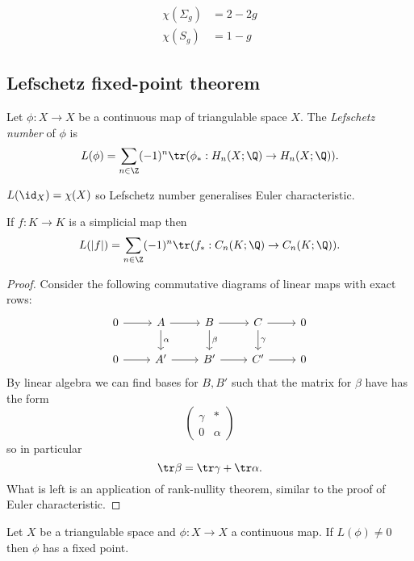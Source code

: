 \documentclass[a4paper]{article}
\begin{document}
\begin{note}
  \begin{align*}
    \chi(\Sigma_g) &= 2 - 2g \\
    \chi(S_g) &= 1 - g
  \end{align*}
\end{note}

\subsection{Lefschetz fixed-point theorem}

\begin{definition}
  Let \(\phi: X \to X\) be a continuous map of triangulable space \(X\). The \emph{Lefschetz number} of \(\phi\) is
  \[
    L(\phi) = \sum_{n \in \Z} (-1)^n \tr(\phi_*: H_n(X; \Q) \to H_n(X; \Q)).
  \]
\end{definition}

\begin{note}
  \(L(\id_X) = \chi(X)\) so Lefschetz number generalises Euler characteristic.
\end{note}

\begin{lemma}
  If \(f: K \to K\) is a simplicial map then
  \[
    L(|f|) = \sum_{n \in \Z} (-1)^n \tr(f_*: C_n(K; \Q) \to C_n(K; \Q)).
  \]
\end{lemma}

\begin{proof}
  Consider the following commutative diagrams of linear maps with exact rows:
  \[
    \begin{tikzcd}
      0 \ar[r] & A \ar[r] \ar[d, "\alpha"] & B \ar[r] \ar[d, "\beta"] & C \ar[r] \ar[d, "\gamma"] & 0 \\
      0 \ar[r] & A' \ar[r] & B' \ar[r] & C' \ar[r] & 0
    \end{tikzcd}
  \]
  By linear algebra we can find bases for \(B, B'\) such that the matrix for \(\beta\) have has the form
  \[
    \begin{pmatrix}
      \gamma & * \\
      0 & \alpha
    \end{pmatrix}
  \]
  so in particular
  \[
    \tr \beta = \tr \gamma + \tr \alpha.
  \]
  What is left is an application of rank-nullity theorem, similar to the proof of Euler characteristic.
\end{proof}

\begin{theorem}
  Let \(X\) be a triangulable space and \(\phi: X \to X\) a continuous map. If \(L(\phi) \neq 0\) then \(\phi\) has a fixed point.
\end{theorem}
\end{document}
